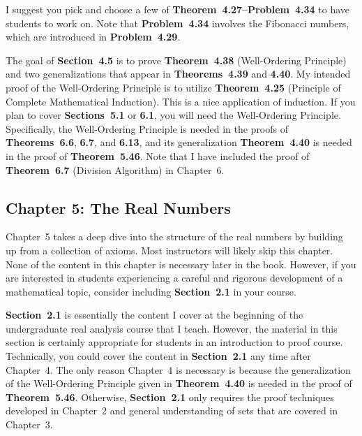 \documentclass[11pt]{article}%
\newcommand{\blankline}{\pagebreak[2]\vspace{.5\baselineskip}}
\begin{document}
\blankline

I suggest you pick and choose a few of \textbf{Theorem~4.27--Problem~4.34} to have students to work on.  Note that \textbf{Problem~4.34} involves the Fibonacci numbers, which are introduced in \textbf{Problem~4.29}.

\blankline

The goal of \textbf{Section~4.5} is to prove \textbf{Theorem~4.38} (Well-Ordering Principle) and two generalizations that appear in \textbf{Theorems~4.39} and \textbf{4.40}. My intended proof of the Well-Ordering Principle is to utilize \textbf{Theorem~4.25} (Principle of Complete Mathematical Induction).  This is a nice application of induction.  If you plan to cover \textbf{Sections~5.1} or \textbf{6.1}, you will need the Well-Ordering Principle.  Specifically, the Well-Ordering Principle is needed in the proofs of \textbf{Theorems~6.6}, \textbf{6.7}, and \textbf{6.13}, and its generalization \textbf{Theorem~4.40} is needed in the proof of \textbf{Theorem~5.46}. Note that I have included the proof of \textbf{Theorem~6.7} (Division Algorithm) in Chapter~6. 


\subsection*{Chapter 5: The Real Numbers}

Chapter~5 takes a deep dive into the structure of the real numbers by building up from a collection of axioms. Most instructors will likely skip this chapter. None of the content in this chapter is necessary later in the book. However, if you are interested in students experiencing a careful and rigorous development of a mathematical topic, consider including \textbf{Section~2.1} in your course.  

\blankline

\textbf{Section~2.1} is essentially the content I cover at the beginning of the undergraduate real analysis course that I teach.  However, the material in this section is certainly appropriate for students in an introduction to proof course. Technically, you could cover the content in \textbf{Section~2.1} any time after Chapter~4.  The only reason Chapter~4 is necessary is because the generalization of the Well-Ordering Principle given in \textbf{Theorem~4.40} is needed in the proof of \textbf{Theorem~5.46}.   Otherwise, \textbf{Section~2.1} only requires the proof techniques developed in Chapter~2 and general understanding of sets that are covered in Chapter~3.
\end{document}
